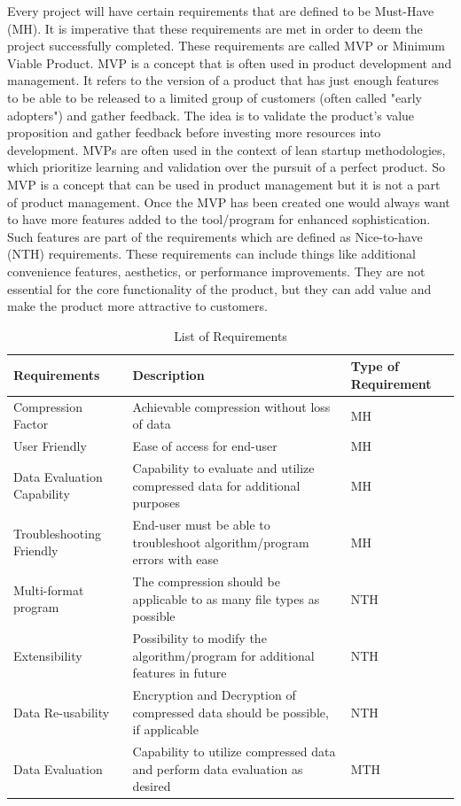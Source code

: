 Every project will have certain requirements that are defined to be Must-Have (MH). It is imperative that these requirements are met in order to deem the project successfully completed. These requirements are called MVP or Minimum Viable Product. MVP is a concept that is often used in product development and management. It refers to the version of a product that has just enough features to be able to be released to a limited group of customers (often called "early adopters") and gather feedback. The idea is to validate the product's value proposition and gather feedback before investing more resources into development. MVPs are often used in the context of lean startup methodologies, which prioritize learning and validation over the pursuit of a perfect product. So MVP is a concept that can be used in product management but it is not a part of product management. Once the MVP has been created one would always want to have more features added to the tool/program for enhanced sophistication. Such features are part of the requirements which are defined as Nice-to-have (NTH) requirements. These requirements can include things like additional convenience features, aesthetics, or performance improvements. They are not essential for the core functionality of the product, but they can add value and make the product more attractive to customers.

\begin{table}[h]
    \centering
    \begin{tabular}{ |p{4cm}||p{4cm}||p{4cm}|}
     \hline
     \textbf{Requirements} & \textbf{Description} & \textbf{Type of Requirement} \\
     \hline
     Compression Factor & Achievable compression without loss of data  & MH\\
     \hline
     User Friendly & Ease of access for end-user & MH  \\
     \hline
     Data Evaluation Capability & Capability to evaluate and utilize compressed data for additional purposes & MH  \\
     \hline
     Troubleshooting Friendly & End-user must be able to troubleshoot algorithm/program errors with ease & MH  \\
     \hline
     Multi-format program & The compression should be applicable to as many file types as possible & NTH \\
     \hline
     Extensibility & Possibility to modify the algorithm/program for additional features in future & NTH \\
     \hline
     Data Re-usability & Encryption and Decryption of compressed data should be possible, if applicable & NTH\\
     \hline
     Data Evaluation  & Capability to utilize compressed data and perform data evaluation as desired & MTH \\
     \hline
    \end{tabular}
    \caption{List of Requirements}
    \label{tab:Requirements List}
\end{table}

\clearpage



